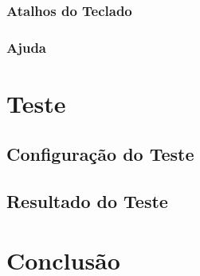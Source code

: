 \documentclass[
	12pt,				%
	openright,			%
	twoside,			%
	a4paper,			%
	english,			%
	brazil				%
	]{abntex2}
\begin{document}
		\subsection{Atalhos do Teclado}
		\subsection{Ajuda}

\chapter{Teste}

	\section{Configuração do Teste}

	\section{Resultado do Teste}
\chapter{Conclusão}

\lipsum[31-33]

\postextual


\end{document}
